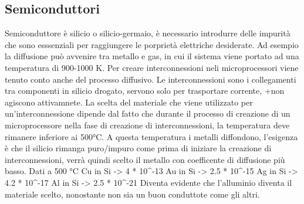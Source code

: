 \documentclass{article}%
\begin{document}
\subsection{ Semiconduttori }%
\label{subsec:Semiconduttori}%
Semiconduttore è silicio o silicio{-}germaio, è necessario introdurre delle impurità che sono esssenziali per raggiungere\newline%
%
le porprietà elettriche desiderate.\newline%
%
\newline%
%
Ad esempio la diffusione può avvenire tra metallo e gas, in cui il sistema viene portato ad una temperatura di 900{-}1000 K.\newline%
%
\newline%
%
Per creare interconnessioni neli microprocessori viene tenuto conto anche del processo diffusivo.\newline%
%
Le interconnessioni sono i collegamenti tra componenti in silicio drogato, servono solo per trasportare corrente, +non agiscono attivamnete.\newline%
%
La scelta del materiale che viene utilizzato per un'interconnessione dipende dal fatto che durante il processo di\newline%
%
creazione di un microprocessore nella fase di creazione di interconnessioni, la temperatura deve rimanere inferiore ai 500°C.\newline%
%
A questa temperatura i metalli diffondono, l'esigenza è che il silicio rimanga puro/impuro come prima di iniziare la creazione di interconnessioni,\newline%
%
verrà quindi scelto il metallo con coefficente di diffusione più basso.\newline%
%
\newline%
%
Dati a 500 °C\newline%
%
Cu in Si {-}> 4   * 10\^{}{-}13\newline%
%
Au in Si {-}> 2.5 * 10\^{}{-}15\newline%
%
Ag in Si {-}> 4.2 * 10\^{}{-}17\newline%
%
Al in Si {-}> 2.5 * 10\^{}{-}21\newline%
%
\newline%
%
Diventa evidente che l'alluminio diventa il materiale scelto, nonostante non sia un buon conduttote come gli altri.\newline%
%
\newline%

%
\end{document}
